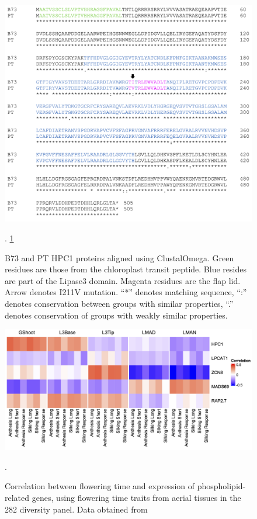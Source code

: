 \documentclass[9pt,twocolumn,twoside,lineno]{biorxiv}
\begin{document}
\clearpage
\clearpage
\begin{figure}[t]
\begin{center}
\includegraphics[width=0.8 \paperwidth]{Sup_Figures/Sup_Fig_10.png}
\caption{B73 and PT HPC1 proteins aligned using ClustalOmega. 
Green residues are those from the chloroplast transit peptide. Blue resides are part of the Lipase3 domain. 
Magenta residues are the flap lid. 
Arrow denotes I211V mutation. “*” denotes matching sequence, “:” denotes conservation between groups with similar properties, “.” denotes conservation of groups with weakly similar properties.}.
\label{figure:Sup:aa_alilnment}
\cref{figure:Sup:aa_alilnment}
\end{center}
\end{figure} 

\clearpage

\begin{figure}[t]
\begin{center}
\includegraphics[width=0.8 \paperwidth]{Sup_Figures/Sup_Fig_11.png}
\caption{Correlation between flowering time and expression of phospholipid-related genes, using flowering time traits from aerial tissues in the 282 diversity panel. 
Data obtained from \cite{Kremling2018-gn}}.
\label{figure:Sup:cor_heatmap}
\end{center}
\end{figure} 
\end{document}

